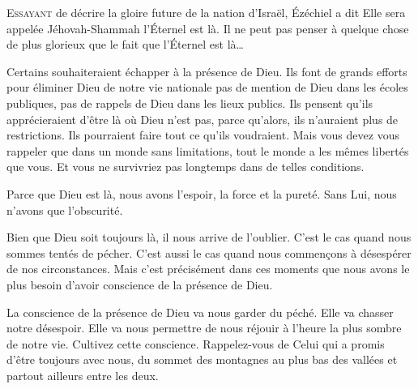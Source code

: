 \dvrule






\lettrine{E}{ssayant} de décrire la gloire future de la nation d'Israël,
 Ézéchiel a dit\frcolon{} 
 \Og Elle sera appelée Jéhovah-Shammah \ocadr l'Éternel est là. \Fg{}
 Il ne peut pas penser à quelque chose de plus glorieux
 que le fait que l'Éternel est là\dots{}

Certains souhaiteraient échapper à la présence de Dieu.
 Ils font de grands efforts pour éliminer Dieu de notre vie nationale
 \ocadr pas de mention de Dieu dans les écoles publiques,
 pas de rappels de Dieu dans les lieux publics.
 Ils pensent qu'ils apprécieraient d'être là où Dieu n'est pas,
 parce qu'alors, ils n'auraient plus de restrictions.
 Ils pourraient faire tout ce qu'ils voudraient.
 Mais vous devez vous rappeler que dans un monde sans limitations,
 tout le monde a les mêmes libertés que vous.
 Et vous ne survivriez pas longtemps dans de telles conditions. 


Parce que Dieu est là, nous avons l'espoir, la force et la pureté.
 Sans Lui, nous n'avons que l'obscurité. 

Bien que Dieu soit toujours là, il nous arrive de l'oublier.
 C'est le cas quand nous sommes tentés de pécher.
 C'est aussi le cas quand nous commen\c{c}ons à désespérer de nos circonstances.
 Mais c'est précisément dans ces moments que nous avons le plus besoin
 d'avoir conscience de la présence de Dieu. 

La conscience de la présence de Dieu va nous garder du péché.
 Elle va chasser notre désespoir. Elle va nous permettre de nous réjouir
 à l'heure la plus sombre de notre vie. Cultivez cette conscience.
 Rappelez-vous de Celui qui a promis d'être toujours avec nous,
 du sommet des montagnes au plus bas des vallées
 et partout ailleurs entre les deux. 

\dvrule



